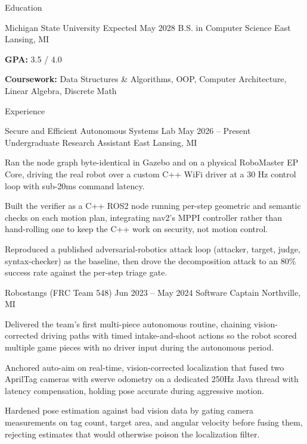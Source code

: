 \documentclass[
	11pt
]{../../../template}
\begin{document}
	\begin{rSection}{E}{ducation}
		\begin{rSectionEntry}
			{Michigan State University}
			{Expected May 2028}
			{B.S. in Computer Science}
			{}
			{East Lansing, MI}

			\item \textbf{GPA:} 3.5 / 4.0
			\item \textbf{Coursework:} Data Structures \& Algorithms, OOP, Computer Architecture, Linear Algebra, Discrete Math
		\end{rSectionEntry}
	\end{rSection}

	\begin{rSection}{E}{xperience}
		\begin{rSectionEntry}
			{Secure and Efficient Autonomous Systems Lab}
			{May 2026 -- Present}
			{Undergraduate Research Assistant}
			{}
			{East Lansing, MI}

			\item Ran the node graph byte-identical in Gazebo and on a physical RoboMaster EP Core, driving the real robot over a custom C++ WiFi driver at a 30 Hz control loop with sub-20ms command latency.
			\item Built the verifier as a C++ ROS2 node running per-step geometric and semantic checks on each motion plan, integrating nav2's MPPI controller rather than hand-rolling one to keep the C++ work on security, not motion control.
			\item Reproduced a published adversarial-robotics attack loop (attacker, target, judge, syntax-checker) as the baseline, then drove the decomposition attack to an 80\% success rate against the per-step triage gate.
		\end{rSectionEntry}

		\begin{rSectionEntry}
			{Robostangs (FRC Team 548)}
			{Jun 2023 -- May 2024}
			{Software Captain}
			{}
			{Northville, MI}

			\item Delivered the team's first multi-piece autonomous routine, chaining vision-corrected driving paths with timed intake-and-shoot actions so the robot scored multiple game pieces with no driver input during the autonomous period.
			\item Anchored auto-aim on real-time, vision-corrected localization that fused two AprilTag cameras with swerve odometry on a dedicated 250Hz Java thread with latency compensation, holding pose accurate during aggressive motion.
			\item Hardened pose estimation against bad vision data by gating camera measurements on tag count, target area, and angular velocity before fusing them, rejecting estimates that would otherwise poison the localization filter.
		\end{rSectionEntry}
	\end{rSection}
\end{document}
